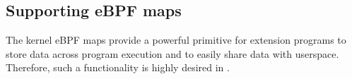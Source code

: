 \subsection{Supporting eBPF maps}
\label{impl:map}
%
%
The kernel eBPF maps provide a powerful primitive for extension programs to
    store data across program execution and to easily share data with userspace.
Therefore, such a functionality is highly desired in \projname{}.

